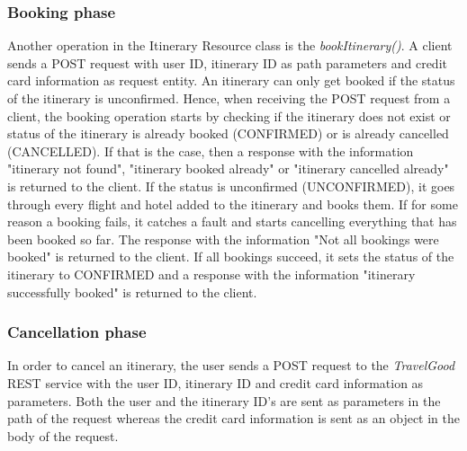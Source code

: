 \subsubsection*{Booking phase}
Another operation in the Itinerary Resource class is the \textit{bookItinerary()}. A client sends a POST request with user ID, itinerary ID as path parameters and credit card information as request entity. An itinerary can only get booked if the status of the itinerary is unconfirmed. Hence, when receiving the POST request from a client, the booking operation starts by checking if the itinerary does not exist or status of the itinerary is already booked (CONFIRMED) or is already cancelled (CANCELLED). If that is the case, then a response with the information "itinerary not found", "itinerary booked already" or "itinerary cancelled already" is returned to the client. If the status is unconfirmed (UNCONFIRMED), it goes through every flight and hotel added to the itinerary and books them. If for some reason a booking fails, it catches a fault and starts cancelling everything that has been booked so far. The response with the information "Not all bookings were booked" is returned to the client. If all bookings succeed, it sets the status of the itinerary to CONFIRMED and a response with the information "itinerary successfully booked" is returned to the client. 

\subsubsection*{Cancellation phase}
In order to cancel an itinerary, the user sends a POST request to the \textit{TravelGood} REST service with the user ID, itinerary ID and credit card information as parameters. Both the user and the itinerary ID’s are sent as parameters in the path of the request whereas the credit card information is sent as an object in the body of the request. 

